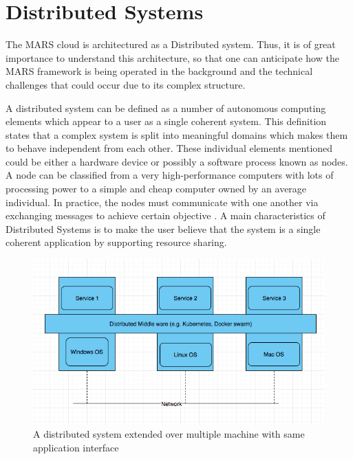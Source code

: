 \section{Distributed Systems}

    The MARS cloud is architectured as a Distributed system. Thus, it is of great importance to understand
    this architecture, so that one can anticipate how the MARS framework is being operated in the background and
    the technical challenges that could occur due to its complex structure.
    \par
    A distributed system can be defined as a number of autonomous computing elements which 
    appear to a user as a single coherent system. 
    This definition states that a complex system is split into meaningful domains which makes them to behave independent from each other.
    These individual elements mentioned could be either a hardware device or possibly a software process known as nodes. A node can
    be classified from a very high-performance computers with lots of processing power to a simple and cheap computer owned by an average individual. 
    In practice, the nodes must communicate with one another via exchanging messages to achieve certain objective \cite[p.~2]{DistributedSystems}.
    A main characteristics of Distributed Systems is to make the user believe that the system is a single coherent application by supporting 
    resource sharing.

    \begin{figure}[htbp!]
        \centering \includegraphics[scale=0.5]{grafiken/distributedSystem.png}
        \caption{A distributed system extended over multiple machine with same application 
        interface \cite[p.~5]{DistributedSystems}}
        \label{fig:distributedSystem}
    \end{figure}

